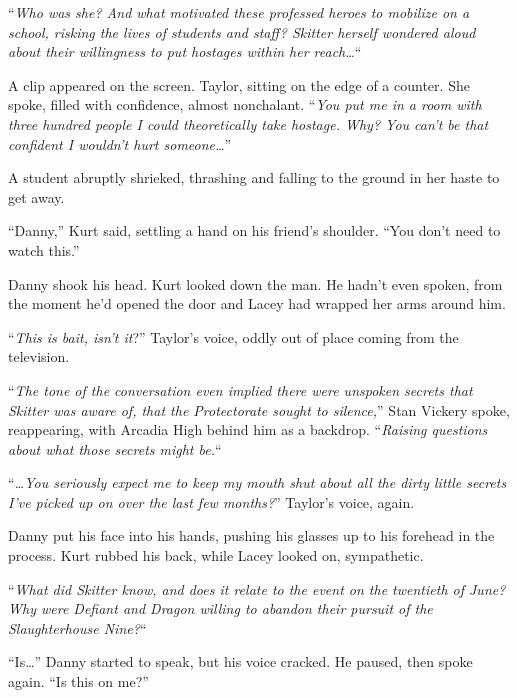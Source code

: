 ``\emph{Who was she?  And what motivated these professed heroes to mobilize on a school, risking the lives of students and staff?  Skitter herself wondered aloud about their willingness to put hostages within her reach\ldots}``



A clip appeared on the screen.  Taylor, sitting on the edge of a counter.  She spoke, filled with confidence, almost nonchalant.  ``\emph{You put me in a room with three hundred people I could theoretically take hostage.  Why?  You can't be that confident I wouldn't hurt someone\ldots}''



A student abruptly shrieked, thrashing and falling to the ground in her haste to get away.



``Danny,'' Kurt said, settling a hand on his friend's shoulder.  ``You don't need to watch this.''



Danny shook his head.  Kurt looked down the man.  He hadn't even spoken, from the moment he'd opened the door and Lacey had wrapped her arms around him.



``\emph{This is bait, isn't it}?'' Taylor's voice, oddly out of place coming from the television.



``\emph{The tone of the conversation even implied there were unspoken secrets that Skitter was aware of, that the Protectorate sought to silence,}'' Stan Vickery spoke, reappearing, with Arcadia High behind him as a backdrop.  ``\emph{Raising questions about what those secrets might be.}``



``\emph{\ldots{}You seriously expect me to keep my mouth shut about all the dirty little secrets I've picked up on over the last few months?}''  Taylor's voice, again.



Danny put his face into his hands, pushing his glasses up to his forehead in the process.  Kurt rubbed his back, while Lacey looked on, sympathetic.



``\emph{What did Skitter know, and does it relate to the event  on the twentieth of June?  Why were Defiant and Dragon willing to abandon their pursuit of the Slaughterhouse Nine?}``



``Is\ldots'' Danny started to speak, but his voice cracked.  He paused, then spoke again.  ``Is this on me?''



